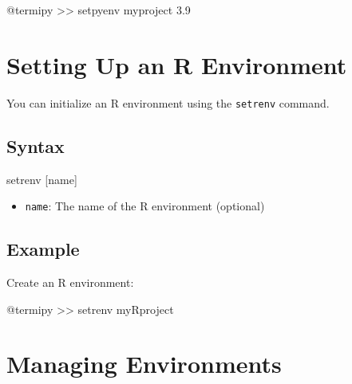 \documentclass[
  letterpaper,
  DIV=11,
  numbers=noendperiod]{scrreprt}
\newenvironment{Shaded}{\begin{snugshade}}{\end{snugshade}}
\newcommand{\ExtensionTok}[1]{\textcolor[rgb]{0.00,0.23,0.31}{#1}}
\newcommand{\NormalTok}[1]{\textcolor[rgb]{0.00,0.23,0.31}{#1}}
\newcommand{\OperatorTok}[1]{\textcolor[rgb]{0.37,0.37,0.37}{#1}}
\newcommand{\PreprocessorTok}[1]{\textcolor[rgb]{0.68,0.00,0.00}{#1}}
\newcommand{\SpecialStringTok}[1]{\textcolor[rgb]{0.13,0.47,0.30}{#1}}
\providecommand{\tightlist}{%
  \setlength{\itemsep}{0pt}\setlength{\parskip}{0pt}}\usepackage{longtable,booktabs,array}
\begin{document}
\begin{Shaded}
\begin{Highlighting}[]
\ExtensionTok{@termipy} \OperatorTok{\textgreater{}\textgreater{}}\NormalTok{ setpyenv myproject 3.9}
\end{Highlighting}
\end{Shaded}

\section*{Setting Up an R
Environment}\label{setting-up-an-r-environment}


You can initialize an R environment using the \texttt{setrenv} command.

\subsection*{Syntax}\label{syntax-1}

\begin{Shaded}
\begin{Highlighting}[]
\ExtensionTok{setrenv} \PreprocessorTok{[}\SpecialStringTok{name}\PreprocessorTok{]}
\end{Highlighting}
\end{Shaded}

\begin{itemize}
\tightlist
\item
  \texttt{name}: The name of the R environment (optional)
\end{itemize}

\subsection*{Example}\label{example}

Create an R environment:

\begin{Shaded}
\begin{Highlighting}[]
\ExtensionTok{@termipy} \OperatorTok{\textgreater{}\textgreater{}}\NormalTok{ setrenv myRproject}
\end{Highlighting}
\end{Shaded}

\section*{Managing Environments}\label{managing-environments}
\end{document}
